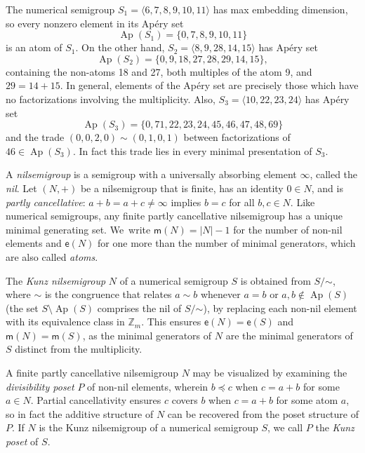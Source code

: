 \documentclass[ALCO]{cedram}
\newcommand\ZZ{\mathbb{Z}}
\newcommand\til{\mathord\sim}
\DeclareMathOperator\Ap{Ap}
\begin{document}
\begin{exam}\label{e:firstexamples}
The numerical semigroup $S_1 = \langle 6, 7, 8, 9, 10, 11 \rangle$ has max embedding dimension, so every nonzero element in its Ap\'ery set
$$\Ap(S_1) = \{0,7,8,9,10,11\}$$
is an atom of $S_1$.  On the other hand, $S_2 = \langle 8,9,28,14,15 \rangle$ has Ap\'ery set
$$\Ap(S_2) = \{0,9,18,27,28,29,14,15\},$$
containing the non-atoms 18 and 27, both multiples of the atom 9, and $29 = 14 + 15$.  In general, elements of the Ap\'ery set are precisely those which have no factorizations involving the multiplicity.  
Also, $S_3 = \langle 10,22,23,24 \rangle$ has Ap\'ery set 
$$\Ap(S_3) = \{0,71,22,23,24,45,46,47,48,69\}$$
and the trade $(0,0,2,0) \sim (0,1,0,1)$ between factorizations of $46 \in \Ap(S_3)$. In fact this trade lies in every minimal presentation of $S_3$.  
\end{exam}

A \emph{nilsemigroup} is a semigroup with a universally absorbing element $\infty$, called the \emph{nil}. Let $(N,+)$ be a nilsemigroup that is finite, has an identity $0 \in N$, and is \emph{partly cancellative}: $a + b = a + c \ne \infty$ implies $b = c$ for all $b, c \in N$.
Like numerical semigroups, any finite partly cancellative nilsemigroup has a unique minimal generating set.  We~write $\mathsf m(N) = |N| - 1$ for the number of non-nil elements and $\mathsf e(N)$ for one more than the number of minimal generators, which are also called \emph{atoms}.  


The \emph{Kunz nilsemigroup} $N$ of a numerical semigroup $S$ is obtained from $S/\til$, where $\til$ is the congruence that relates $a \sim b$ whenever $a = b$ or $a, b \notin \Ap(S)$ (the set $S \setminus \Ap(S)$ comprises the nil of $S/\til$), by replacing each non-nil element with its equivalence class in $\ZZ_m$.  This ensures $\mathsf e(N) = \mathsf e(S)$ and $\mathsf m(N) = \mathsf m(S)$, as the minimal generators of $N$ are the minimal generators of $S$ distinct from the multiplicity.  

A finite partly cancellative nilsemigroup $N$ may be visualized by examining the \emph{divisibility poset} $P$ of non-nil elements, wherein $b \preceq c$ when $c = a + b$ for some $a \in N$.  Partial cancellativity ensures $c$ covers $b$ when $c = a + b$ for some atom $a$, so in fact the additive structure of $N$ can be recovered from the poset structure of $P$.  If $N$ is the Kunz nilsemigroup of a numerical semigroup $S$, we call $P$ the \emph{Kunz poset} of $S$.  
\end{document}

